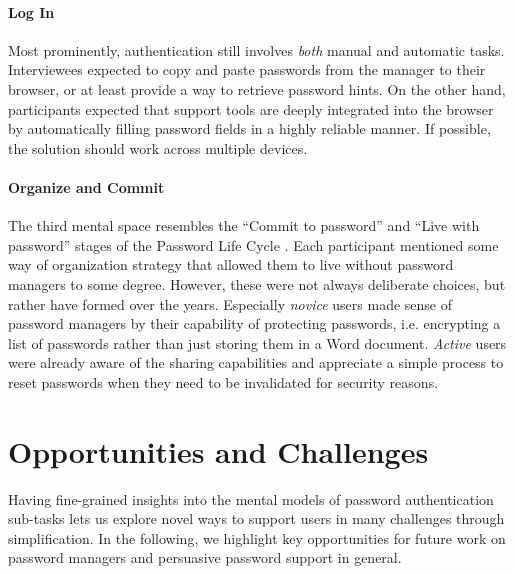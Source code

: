 \paragraph{Log In}
Most prominently, authentication still involves \textit{both} manual and automatic tasks. Interviewees expected to copy and paste passwords from the manager to their browser, or at least provide a way to retrieve password hints.  On the other hand, participants expected that support tools are deeply integrated into the browser by automatically filling password fields in a highly reliable manner. If possible, the solution should work across multiple devices. 

\paragraph{Organize and Commit}
The third mental space resembles the ``Commit to password'' and ``Live with password'' stages of the Password Life Cycle \cite{Stobert2014PasswordLifeCycle}. Each participant mentioned some way of organization strategy that allowed them to live without password managers to some degree. However, these were not always deliberate choices, but rather have formed over the years. Especially \textit{novice} users made sense of password managers by their capability of protecting passwords, i.e. encrypting a list of passwords rather than just storing them in a Word document. \textit{Active} users were already aware of the sharing capabilities and appreciate a simple process to reset passwords when they need to be invalidated for security reasons.

\section{Opportunities and Challenges}
Having fine-grained insights into the mental models of password authentication sub-tasks lets us explore novel ways to support users in many challenges through simplification. In the following, we highlight key opportunities for future work on password managers and persuasive password support in general. 

